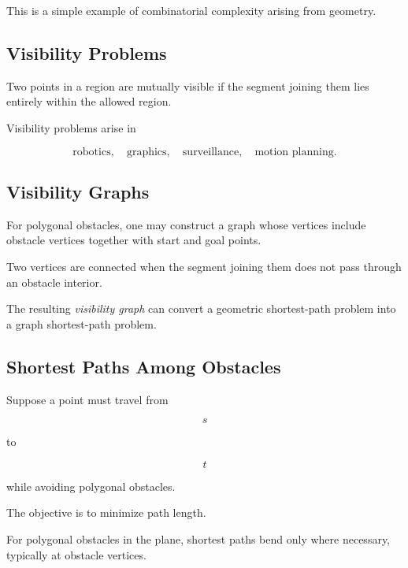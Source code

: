 This is a simple example of combinatorial complexity arising from geometry.

\subsection{Visibility Problems}
\label{subsec:visibility-problems}

Two points in a region are mutually visible if the segment joining them lies
entirely within the allowed region.

Visibility problems arise in

\[
\boxed{
\text{robotics},
\quad
\text{graphics},
\quad
\text{surveillance},
\quad
\text{motion planning}.
}
\]

\subsection{Visibility Graphs}
\label{subsec:visibility-graphs}

For polygonal obstacles, one may construct a graph whose vertices include
obstacle vertices together with start and goal points.

Two vertices are connected when the segment joining them does not pass
through an obstacle interior.

The resulting \emph{visibility graph} can convert a geometric shortest-path
problem into a graph shortest-path problem.

\subsection{Shortest Paths Among Obstacles}
\label{subsec:shortest-path-obstacles}

Suppose a point must travel from

\[
s
\]

to

\[
t
\]

while avoiding polygonal obstacles.

The objective is to minimize path length.

For polygonal obstacles in the plane, shortest paths bend only where
necessary, typically at obstacle vertices.

